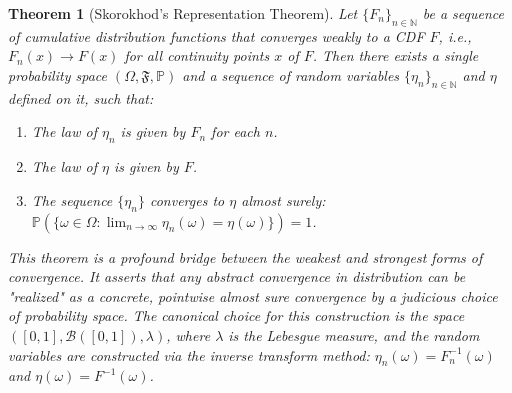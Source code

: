 \documentclass[12pt, openany]{book}
\theoremstyle{definition}
\theoremstyle{plain}
\newtheorem{theorem}[definition]{Theorem}
\theoremstyle{remark}
\newcommand{\N}{\mathbb{N}}
\newcommand{\B}{\mathcal{B}}
\newcommand{\probP}{\mathbb{P}}
\newcommand{\germF}{\mathfrak{F}} %
\begin{document}
\begin{theorem}[Skorokhod's Representation Theorem]
Let $\{F_n\}_{n\in\N}$ be a sequence of cumulative distribution functions that converges weakly to a CDF $F$, i.e., $F_n(x) \to F(x)$ for all continuity points $x$ of $F$. Then there exists a single probability space $(\Omega, \germF, \probP)$ and a sequence of random variables $\{\eta_n\}_{n\in\N}$ and $\eta$ defined on it, such that:
\begin{enumerate}
    \item The law of $\eta_n$ is given by $F_n$ for each $n$.
    \item The law of $\eta$ is given by $F$.
    \item The sequence $\{\eta_n\}$ converges to $\eta$ almost surely: $\probP(\{\omega \in \Omega : \lim_{n\to\infty} \eta_n(\omega) = \eta(\omega)\}) = 1$.
\end{enumerate}
This theorem is a profound bridge between the weakest and strongest forms of convergence. It asserts that any abstract convergence in distribution can be "realized" as a concrete, pointwise almost sure convergence by a judicious choice of probability space. The canonical choice for this construction is the space $([0,1], \B([0,1]), \lambda)$, where $\lambda$ is the Lebesgue measure, and the random variables are constructed via the inverse transform method: $\eta_n(\omega) = F_n^{-1}(\omega)$ and $\eta(\omega) = F^{-1}(\omega)$.
\end{theorem}
\end{document}
